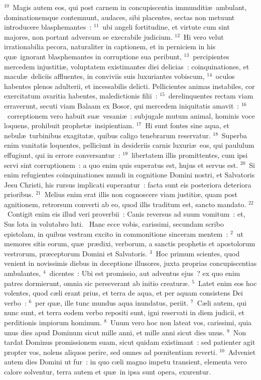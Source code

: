 ${}^{10}$~Magis autem eos, qui post carnem in concupiscentia immunditi\ae\ ambulant, dominationemque contemnunt, audaces, sibi placentes, sectas non metuunt introducere blasphemantes~:
${}^{11}$~ubi angeli fortitudine, et virtute cum sint majores, non portant adversum se execrabile judicium.
${}^{12}$~Hi vero velut irrationabilia pecora, naturaliter in captionem, et in perniciem in his qu\ae\ ignorant blasphemantes in corruptione sua peribunt,
${}^{13}$~percipientes mercedem injustiti\ae , voluptatem existimantes diei delicias~: coinquinationes, et macul\ae\ deliciis affluentes, in conviviis suis luxuriantes vobiscum,
${}^{14}$~oculos habentes plenos adulterii, et incessabilis delicti. Pellicientes animas instabiles, cor exercitatum avaritia habentes, maledictionis filii~:
${}^{15}$~derelinquentes rectam viam erraverunt, secuti viam Balaam ex Bosor, qui mercedem iniquitatis amavit~:
${}^{16}$~correptionem vero habuit su\ae\ vesani\ae~: subjugale mutum animal, hominis voce loquens, prohibuit prophet\ae\ insipientiam.
${}^{17}$~Hi sunt fontes sine aqua, et nebul\ae\ turbinibus exagitat\ae , quibus caligo tenebrarum reservatur.
${}^{18}$~Superba enim vanitatis loquentes, pelliciunt in desideriis carnis luxuri\ae\ eos, qui paululum effugiunt, qui in errore conversantur~:
${}^{19}$~libertatem illis promittentes, cum ipsi servi sint corruptionem~: a quo enim quis superatus est, hujus et servus est.
${}^{20}$~Si enim refugientes coinquinationes mundi in cognitione Domini nostri, et Salvatoris Jesu Christi, his rursus implicati superantur~: facta sunt eis posteriora deteriora prioribus.
${}^{21}$~Melius enim erat illis non cognoscere viam justiti\ae , quam post agnitionem, retrorsum converti ab eo, quod illis traditum est, sancto mandato.
${}^{22}$~Contigit enim eis illud veri proverbii~: Canis reversus ad suum vomitum~: et, Sus lota in volutabro luti.
~Hanc ecce vobis, carissimi, secundam scribo epistolam, in quibus vestram excito in commonitione sinceram mentem~:
${}^{2}$~ut memores sitis eorum, qu\ae\ pr\ae dixi, verborum, a sanctis prophetis et apostolorum vestrorum, pr\ae ceptorum Domini et Salvatoris.
${}^{3}$~Hoc primum scientes, quod venient in novissimis diebus in deceptione illusores, juxta proprias concupiscentias ambulantes,
${}^{4}$~dicentes~: Ubi est promissio, aut adventus ejus~? ex quo enim patres dormierunt, omnia sic perseverant ab initio creatur\ae .
${}^{5}$~Latet enim eos hoc volentes, quod c\ae li erant prius, et terra de aqua, et per aquam consistens Dei verbo~:
${}^{6}$~per qu\ae , ille tunc mundus aqua inundatus, periit.
${}^{7}$~C\ae li autem, qui nunc sunt, et terra eodem verbo repositi sunt, igni reservati in diem judicii, et perditionis impiorum hominum.
${}^{8}$~Unum vero hoc non lateat vos, carissimi, quia unus dies apud Dominum sicut mille anni, et mille anni sicut dies unus.
${}^{9}$~Non tardat Dominus promissionem suam, sicut quidam existimant~: sed patienter agit propter vos, nolens aliquos perire, sed omnes ad pœnitentiam reverti.
${}^{10}$~Adveniet autem dies Domini ut fur~: in quo c\ae li magno impetu transient, elementa vero calore solventur, terra autem et qu\ae\ in ipsa sunt opera, exurentur.


